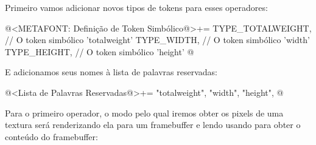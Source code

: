 {Primeiro vamos adicionar novos tipos de tokens para esses operadores:

\iniciocodigo
@<METAFONT: Definição de Token Simbólico@>+=
TYPE_TOTALWEIGHT,        // O token simbólico 'totalweight'
TYPE_WIDTH,              // O token simbólico 'width'
TYPE_HEIGHT,             // O token simbólico 'height'
@
\fimcodigo

E adicionamos seus nomes à lista de palavras reservadas:

\iniciocodigo
@<Lista de Palavras Reservadas@>+=
"totalweight", "width", "height",
@
\fimcodigo

Para o primeiro operador, o modo pelo qual iremos obter os pixels de
uma textura será renderizando ela para um framebuffer e lendo
usando  para obter o conteúdo do framebuffer:

}
